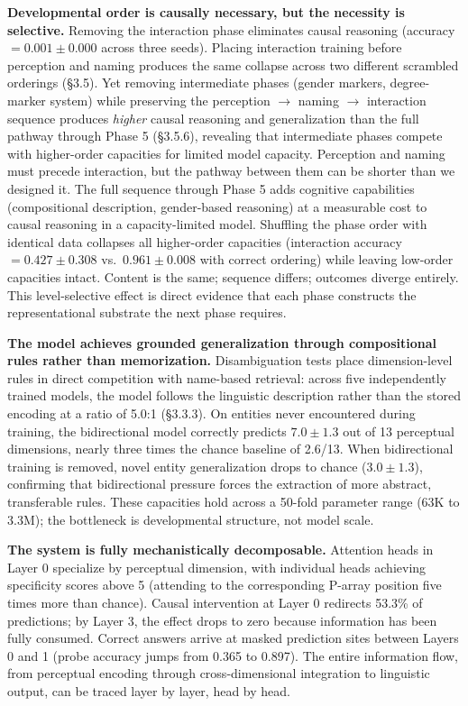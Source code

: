 \documentclass{article}
\begin{document}
\textbf{Developmental order is causally necessary, but the necessity is selective.} Removing the interaction phase eliminates causal reasoning (accuracy $= 0.001 \pm 0.000$ across three seeds). Placing interaction training before perception and naming produces the same collapse across two different scrambled orderings (\S3.5). Yet removing intermediate phases (gender markers, degree-marker system) while preserving the perception $\rightarrow$ naming $\rightarrow$ interaction sequence produces \emph{higher} causal reasoning and generalization than the full pathway through Phase 5 (\S3.5.6), revealing that intermediate phases compete with higher-order capacities for limited model capacity. Perception and naming must precede interaction, but the pathway between them can be shorter than we designed it. The full sequence through Phase 5 adds cognitive capabilities (compositional description, gender-based reasoning) at a measurable cost to causal reasoning in a capacity-limited model. Shuffling the phase order with identical data collapses all higher-order capacities (interaction accuracy $= 0.427 \pm 0.308$ vs.\ $0.961 \pm 0.008$ with correct ordering) while leaving low-order capacities intact. Content is the same; sequence differs; outcomes diverge entirely. This level-selective effect is direct evidence that each phase constructs the representational substrate the next phase requires.

\textbf{The model achieves grounded generalization through compositional rules rather than memorization.} Disambiguation tests place dimension-level rules in direct competition with name-based retrieval: across five independently trained models, the model follows the linguistic description rather than the stored encoding at a ratio of 5.0:1 (\S3.3.3). On entities never encountered during training, the bidirectional model correctly predicts $7.0 \pm 1.3$ out of 13 perceptual dimensions, nearly three times the chance baseline of 2.6/13. When bidirectional training is removed, novel entity generalization drops to chance ($3.0 \pm 1.3$), confirming that bidirectional pressure forces the extraction of more abstract, transferable rules. These capacities hold across a 50-fold parameter range (63K to 3.3M); the bottleneck is developmental structure, not model scale.

\textbf{The system is fully mechanistically decomposable.} Attention heads in Layer 0 specialize by perceptual dimension, with individual heads achieving specificity scores above 5 (attending to the corresponding P-array position five times more than chance). Causal intervention at Layer 0 redirects 53.3\% of predictions; by Layer 3, the effect drops to zero because information has been fully consumed. Correct answers arrive at masked prediction sites between Layers 0 and 1 (probe accuracy jumps from 0.365 to 0.897). The entire information flow, from perceptual encoding through cross-dimensional integration to linguistic output, can be traced layer by layer, head by head.
\end{document}
